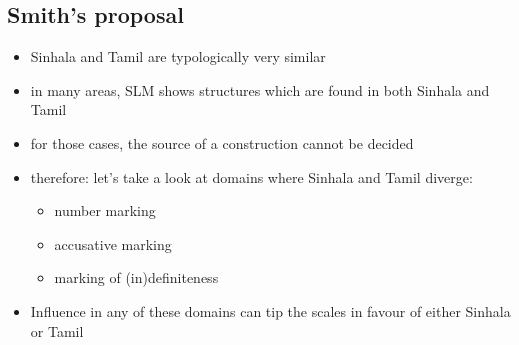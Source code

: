 \documentclass[a4paper,12pt]{article}
\begin{document}
\subsection{Smith's proposal}
\begin{itemize}
 \item Sinhala and Tamil are typologically very similar
 \item in many areas, SLM shows structures which are found in both Sinhala and Tamil
 \item for those cases, the source of a construction cannot be decided
 \item therefore: let's take a look at domains where Sinhala and Tamil diverge:
\begin{itemize}
 \item number marking
 \item accusative marking
 \item marking of (in)definiteness
\end{itemize}
 \item Influence in any of these domains can tip the scales in favour of either Sinhala or Tamil
\end{itemize}
\end{document}
